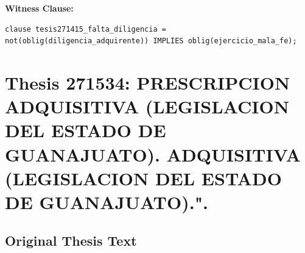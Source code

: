 \documentclass[11pt,a4paper]{article}
\begin{document}
\textbf{Witness Clause:}

\begin{lstlisting}[style=witnessstyle, language=Witness]
clause tesis271415_falta_diligencia = not(oblig(diligencia_adquirente)) IMPLIES oblig(ejercicio_mala_fe);
\end{lstlisting}

\newpage

\section{Thesis 271534: PRESCRIPCION ADQUISITIVA (LEGISLACION DEL ESTADO DE GUANAJUATO). ADQUISITIVA (LEGISLACION DEL ESTADO DE GUANAJUATO).".}
\label{thesis:271534}

\subsection{Original Thesis Text}
\end{document}
